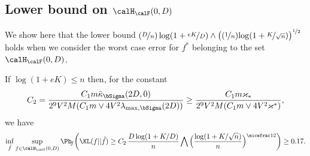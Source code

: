 \subsection{Lower bound on $\calH_\calF(0,D)$} %

We show here that the lower bound ${(\nicefrac{D}n)\log(1+\nicefrac{e K}D)}
\wedge\big((\nicefrac1n){\log(1+\nicefrac{K}{\sqrt{n}})}\big)^{\nicefrac12}$ holds 
when we consider the worst case  error for $f^*$ belonging to the set $\calH_\calF(0,D)$. 
\begin{proposition}
\label{prop:lower:1}
If $\log(1+eK)\le  n$ then, for the constant
\begin{equation}
C_2=\frac{C_1 m\bar\kappa_{\bSigma}(2D,0)}{2^{9}V^2 M(C_1m\vee 4V^2\lambda_{\max,\bSigma}(2D))}
\ge \frac{C_1 m\varkappa_*}{2^{9}V^2 M(C_1m\vee 4V^2\varkappa^*)},
\end{equation} 
we have
\begin{equation}
\inf_{\hat f}\sup_{f \in \calH_\calF(0,D)}\Pb\!_{f}\bigg(\KL(f||\hat f)\geq
C_2\,\frac{D\log(1+ K/D)}{n}\bigwedge\Big(\frac{\log(1+K/\sqrt{n})}{n}\Big)^{\nicefrac12}\bigg)
\geq 0.17.
\end{equation}
\end{proposition}

